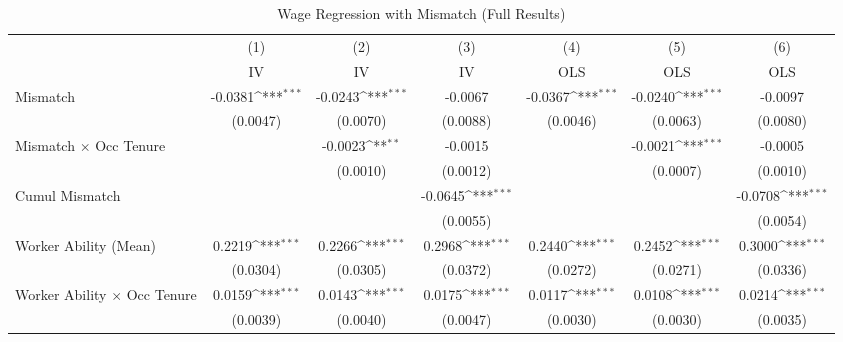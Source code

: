 {
\def\sym#1{\ifmmode^{#1}\else\(^{#1}\)\fi}
\begin{longtable}{l*{6}{c}}
\caption{Wage Regression with Mismatch (Full Results)}\\
\hline  \endfirsthead\hline  \endhead\hline  \endfoot\endlastfoot
                    &\multicolumn{1}{c}{(1)}&\multicolumn{1}{c}{(2)}&\multicolumn{1}{c}{(3)}&\multicolumn{1}{c}{(4)}&\multicolumn{1}{c}{(5)}&\multicolumn{1}{c}{(6)}\\
                    &\multicolumn{1}{c}{IV}&\multicolumn{1}{c}{IV}&\multicolumn{1}{c}{IV}&\multicolumn{1}{c}{OLS}&\multicolumn{1}{c}{OLS}&\multicolumn{1}{c}{OLS}\\
\hline  
Mismatch            &     -0.0381\sym{***}&     -0.0243\sym{***}&     -0.0067         &     -0.0367\sym{***}&     -0.0240\sym{***}&     -0.0097         \\
                    &    (0.0047)         &    (0.0070)         &    (0.0088)         &    (0.0046)         &    (0.0063)         &    (0.0080)         \\
Mismatch $\times$ Occ Tenure&                     &     -0.0023\sym{**} &     -0.0015         &                     &     -0.0021\sym{***}&     -0.0005         \\
                    &                     &    (0.0010)         &    (0.0012)         &                     &    (0.0007)         &    (0.0010)         \\
Cumul Mismatch      &                     &                     &     -0.0645\sym{***}&                     &                     &     -0.0708\sym{***}\\
                    &                     &                     &    (0.0055)         &                     &                     &    (0.0054)         \\
Worker Ability (Mean)&      0.2219\sym{***}&      0.2266\sym{***}&      0.2968\sym{***}&      0.2440\sym{***}&      0.2452\sym{***}&      0.3000\sym{***}\\
                    &    (0.0304)         &    (0.0305)         &    (0.0372)         &    (0.0272)         &    (0.0271)         &    (0.0336)         \\
Worker Ability $\times$ Occ Tenure&      0.0159\sym{***}&      0.0143\sym{***}&      0.0175\sym{***}&      0.0117\sym{***}&      0.0108\sym{***}&      0.0214\sym{***}\\
                    &    (0.0039)         &    (0.0040)         &    (0.0047)         &    (0.0030)         &    (0.0030)         &    (0.0035)         \\

\end{longtable}}
